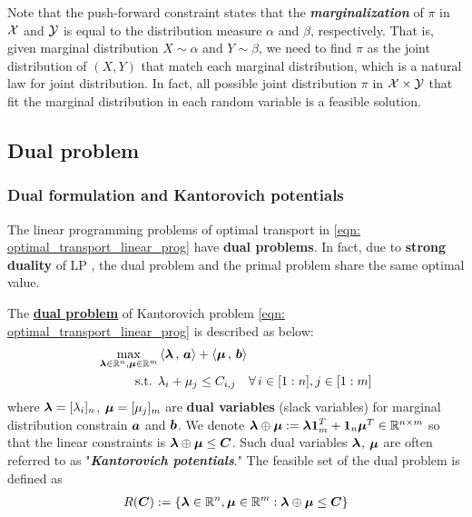 \documentclass[11pt]{article}
\begin{document}
Note that the push-forward constraint states that the \emph{\textbf{marginalization}} of $\pi$ in ${\mathcal X}$ and ${\mathcal Y}$ is equal to the distribution measure $\alpha$ and $\beta$, respectively. That is, given marginal distribution $X \sim \alpha$ and $Y \sim \beta$, we need to find $\pi$ as the joint distribution of $(X,Y)$ that match each marginal distribution, which is a natural law for joint distribution. In fact, all possible joint distribution $\pi$ in ${\mathcal X} \times {\mathcal Y}$ that fit the marginal distribution in each random variable is a feasible solution. 


\subsection{Dual problem}
\subsubsection{Dual formulation and Kantorovich potentials}
The linear programming problems of optimal transport in \eqref{eqn: optimal_transport_linear_prog} have \textbf{dual problems}. In fact, due to \textbf{strong duality} of LP \citep{bertsimas1997introduction}, the dual problem and the primal problem share the same optimal value. 

The \underline{\textbf{dual problem}} of Kantorovich problem \eqref{eqn: optimal_transport_linear_prog} is described as below:
\begin{align}
\max_{\boldsymbol{\lambda} \in {\mathbb R}^{n}, \boldsymbol{\mu} \in {\mathbb R}^{m}} & \left\langle \boldsymbol{\lambda}\,,\, \boldsymbol{a} \right\rangle + \left\langle \boldsymbol{\mu}\,,\, \boldsymbol{b} \right\rangle \label{eqn: optimal_transport_dual}\\
\text{s.t. } & \lambda_i + \mu_{j} \le C_{i,j}\quad \forall\, i\in [1:n], j\in [1:m] \label{eqn: optimal_transport_dual_constraint}
\end{align} where $\boldsymbol{\lambda}= [\lambda_i]_{n}$, $\boldsymbol{\mu}= [\mu_{j}]_{m}$ are \textbf{dual variables} (slack variables) for marginal distribution constrain $\boldsymbol{a}$ and $\boldsymbol{b}$. We denote $\boldsymbol{\lambda}\oplus \boldsymbol{\mu}:= \boldsymbol{\lambda}\boldsymbol{1}_{m}^{T} + \boldsymbol{1}_{n}\boldsymbol{\mu}^{T} \in {\mathbb R}^{n\times m}$ so that the linear constraints is $\boldsymbol{\lambda}\oplus \boldsymbol{\mu} \le \boldsymbol{C}$. Such dual variables $\boldsymbol{\lambda}$, $\boldsymbol{\mu}$ are often referred to as "\emph{\textbf{Kantorovich potentials}}." The feasible set of the dual problem is defined as 
\begin{align}
R(\boldsymbol{C}) := \left\{\boldsymbol{\lambda} \in {\mathbb R}^{n}, \boldsymbol{\mu} \in {\mathbb R}^{m}: \boldsymbol{\lambda}\oplus \boldsymbol{\mu} \le \boldsymbol{C}\right\} \label{eqn: optimal_transport_dual_feasible_set}
\end{align}
\end{document}

